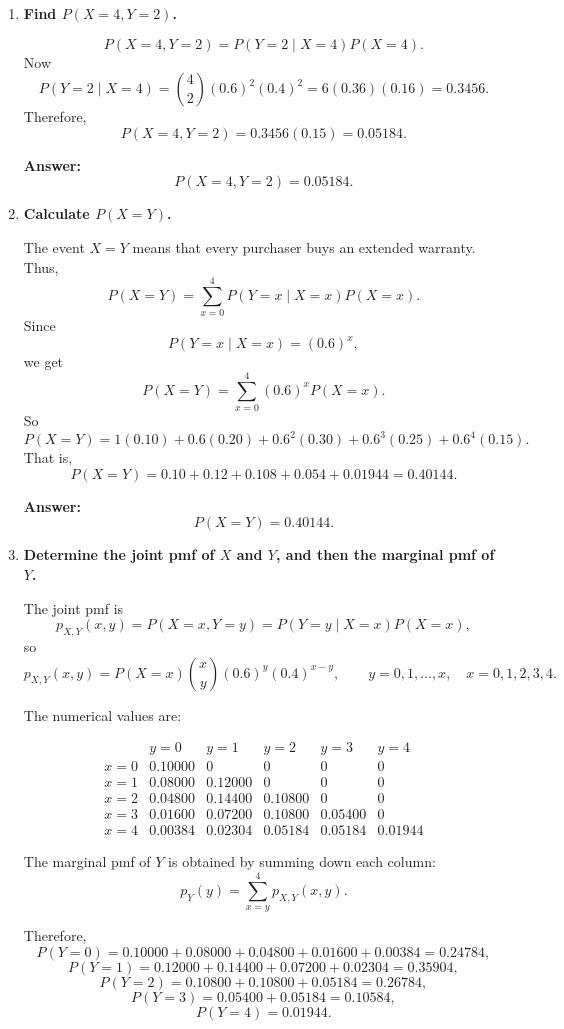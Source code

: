 \begin{enumerate}
    \item[(a)] \textbf{Find $P(X=4,Y=2)$.}

    \[
    P(X=4,Y=2)=P(Y=2\mid X=4)P(X=4).
    \]
    Now
    \[
    P(Y=2\mid X=4)=\binom{4}{2}(0.6)^2(0.4)^2
    =6(0.36)(0.16)=0.3456.
    \]
    Therefore,
    \[
    P(X=4,Y=2)=0.3456(0.15)=0.05184.
    \]

    \textbf{Answer:}
    \[
    P(X=4,Y=2)=0.05184.
    \]

    \item[(b)] \textbf{Calculate $P(X=Y)$.}

    The event $X=Y$ means that every purchaser buys an extended warranty. Thus,
    \[
    P(X=Y)=\sum_{x=0}^4 P(Y=x\mid X=x)P(X=x).
    \]
    Since
    \[
    P(Y=x\mid X=x)=(0.6)^x,
    \]
    we get
    \[
    P(X=Y)=\sum_{x=0}^4 (0.6)^x P(X=x).
    \]
    So
    \[
    P(X=Y)=1(0.10)+0.6(0.20)+0.6^2(0.30)+0.6^3(0.25)+0.6^4(0.15).
    \]
    That is,
    \[
    P(X=Y)=0.10+0.12+0.108+0.054+0.01944=0.40144.
    \]

    \textbf{Answer:}
    \[
    P(X=Y)=0.40144.
    \]

    \item[(c)] \textbf{Determine the joint pmf of $X$ and $Y$, and then the marginal pmf of $Y$.}

    The joint pmf is
    \[
    p_{X,Y}(x,y)=P(X=x,Y=y)=P(Y=y\mid X=x)P(X=x),
    \]
    so
    \[
    p_{X,Y}(x,y)=P(X=x)\binom{x}{y}(0.6)^y(0.4)^{x-y},
    \qquad y=0,1,\dots,x,\quad x=0,1,2,3,4.
    \]

    The numerical values are:

    \[
    \begin{array}{c|ccccc}
    & y=0 & y=1 & y=2 & y=3 & y=4\\
    \hline
    x=0 & 0.10000 & 0 & 0 & 0 & 0\\
    x=1 & 0.08000 & 0.12000 & 0 & 0 & 0\\
    x=2 & 0.04800 & 0.14400 & 0.10800 & 0 & 0\\
    x=3 & 0.01600 & 0.07200 & 0.10800 & 0.05400 & 0\\
    x=4 & 0.00384 & 0.02304 & 0.05184 & 0.05184 & 0.01944
    \end{array}
    \]

    The marginal pmf of $Y$ is obtained by summing down each column:
    \[
    p_Y(y)=\sum_{x=y}^4 p_{X,Y}(x,y).
    \]

    Therefore,
    \[
    P(Y=0)=0.10000+0.08000+0.04800+0.01600+0.00384=0.24784,
    \]
    \[
    P(Y=1)=0.12000+0.14400+0.07200+0.02304=0.35904,
    \]
    \[
    P(Y=2)=0.10800+0.10800+0.05184=0.26784,
    \]
    \[
    P(Y=3)=0.05400+0.05184=0.10584,
    \]
    \[
    P(Y=4)=0.01944.
    \]


\end{enumerate}
